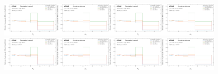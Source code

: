 \begin{figure}[h!]
\centering
\includegraphics[width=0.25\textwidth,page=1]{figures/SimResults/MultiFold_TrackJet_SystEffect.pdf}\includegraphics[width=0.25\textwidth,page=2]{figures/SimResults/MultiFold_TrackJet_SystEffect.pdf}\includegraphics[width=0.25\textwidth,page=3]{figures/SimResults/MultiFold_TrackJet_SystEffect.pdf}\includegraphics[width=0.25\textwidth,page=4]{figures/SimResults/MultiFold_TrackJet_SystEffect.pdf}\\
\includegraphics[width=0.25\textwidth,page=5]{figures/SimResults/MultiFold_TrackJet_SystEffect.pdf}\includegraphics[width=0.25\textwidth,page=7]{figures/SimResults/MultiFold_TrackJet_SystEffect.pdf}\includegraphics[width=0.25\textwidth,page=7]{figures/SimResults/MultiFold_TrackJet_SystEffect.pdf}\includegraphics[width=0.25\textwidth,page=8]{figures/SimResults/MultiFold_TrackJet_SystEffect.pdf}\\

\end{figure}
